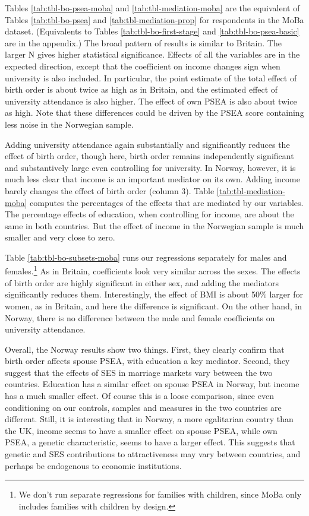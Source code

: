 \documentclass[
  12pt,
]{article}
\theoremstyle{definition}
\theoremstyle{definition}
\theoremstyle{definition}
\theoremstyle{definition}
\theoremstyle{remark}
\begin{document}
Tables \ref{tab:tbl-bo-psea-moba} and \ref{tab:tbl-mediation-moba} are the
equivalent of Tables \ref{tab:tbl-bo-psea} and \ref{tab:tbl-mediation-prop}
for respondents in the MoBa dataset. (Equivalents to Tables
\ref{tab:tbl-bo-first-stage} and \ref{tab:tbl-bo-psea-basic} are in the
appendix.) The broad pattern of results is similar to Britain. The larger N
gives higher statistical significance. Effects of all the variables are in the
expected direction, except that the coefficient on income changes sign when
university is also included. In particular, the point estimate of the total
effect of birth order is about twice as high as in Britain, and the estimated
effect of university attendance is also higher. The effect of own PSEA is also
about twice as high. Note that these differences could be driven by the PSEA score
containing less noise in the Norwegian sample.

Adding university attendance again substantially and significantly reduces
the effect of birth order, though here, birth order remains independently
significant and substantively large even controlling for university.
In Norway, however, it is much less clear that income is an important mediator
on its own. Adding income barely changes the effect of birth order (column 3).
Table \ref{tab:tbl-mediation-moba} computes the percentages of the effects that
are mediated by our variables. The percentage effects of education, when
controlling for income, are about the same in both countries. But the effect of
income in the Norwegian sample is much smaller and very close to zero.

Table \ref{tab:tbl-bo-subsets-moba} runs our regressions separately for males
and females.\footnote{We don't run separate regressions for families with children, since
  MoBa only includes families with children by design.} As in Britain, coefficients look very
similar across the sexes. The effects of birth order are highly significant in
either sex, and adding the mediators significantly reduces them. Interestingly,
the effect of BMI is about 50\% larger for women, as in Britain, and here the
difference is significant. On the other hand, in Norway, there is no difference
between the male and female coefficients on university attendance.

Overall, the Norway results show two things. First, they clearly confirm that
birth order affects spouse PSEA, with education a key mediator. Second, they
suggest that the effects of SES in marriage markets vary between the two
countries. Education has a similar effect on spouse PSEA in Norway, but income
has a much smaller effect. Of course this is a loose comparison, since even
conditioning on our controls, samples and measures in the two countries are
different. Still, it is interesting that in Norway, a more egalitarian country
than the UK, income seems to have a smaller effect on spouse PSEA, while own
PSEA, a genetic characteristic, seems to have a larger effect. This suggests
that genetic and SES contributions to attractiveness may vary between countries,
and perhaps be endogenous to economic institutions.
\end{document}
